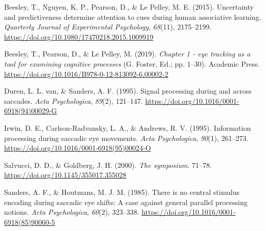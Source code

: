 \documentclass[
  man,
  floatsintext,
  longtable,
  nolmodern,
  notxfonts,
  notimes,
  colorlinks=true,linkcolor=blue,citecolor=blue,urlcolor=blue]{apa7}
\newlength{\cslhangindent}
\newenvironment{CSLReferences}[2] %
 {\begin{list}{}{%
  \setlength{\itemindent}{0pt}
  \setlength{\leftmargin}{0pt}
  \setlength{\parsep}{0pt}
  \ifodd #1
   \setlength{\leftmargin}{\cslhangindent}
   \setlength{\itemindent}{-1\cslhangindent}
  \fi
  \setlength{\itemsep}{#2\baselineskip}}}
 {\end{list}}
\begin{document}
\protect{}\label{refs}
\begin{CSLReferences}{1}{0}
Beesley, T., Nguyen, K. P., Pearson, D., \& Le Pelley, M. E. (2015).
Uncertainty and predictiveness determine attention to cues during human
associative learning. \emph{Quarterly Journal of Experimental
Psychology}, \emph{68}(11), 2175--2199.
\url{https://doi.org/10.1080/17470218.2015.1009919}

Beesley, T., Pearson, D., \& Le Pelley, M. (2019). \emph{Chapter 1 - eye
tracking as a tool for examining cognitive processes} (G. Foster, Ed.;
pp. 1--30). Academic Press.
\url{https://doi.org/10.1016/B978-0-12-813092-6.00002-2}

Duren, L. L. van, \& Sanders, A. F. (1995). Signal processing during and
across saccades. \emph{Acta Psychologica}, \emph{89}(2), 121--147.
\url{https://doi.org/10.1016/0001-6918(94)00029-G}

Irwin, D. E., Carlson-Radvansky, L. A., \& Andrews, R. V. (1995).
Information processing during saccadic eye movements. \emph{Acta
Psychologica}, \emph{90}(1), 261--273.
\url{https://doi.org/10.1016/0001-6918(95)00024-O}

Salvucci, D. D., \& Goldberg, J. H. (2000). \emph{The symposium}.
71--78. \url{https://doi.org/10.1145/355017.355028}

Sanders, A. F., \& Houtmans, M. J. M. (1985). There is no central
stimulus encoding during saccadic eye shifts: A case against general
parallel processing notions. \emph{Acta Psychologica}, \emph{60}(2),
323--338. \url{https://doi.org/10.1016/0001-6918(85)90060-5}

\end{CSLReferences}
\end{document}

